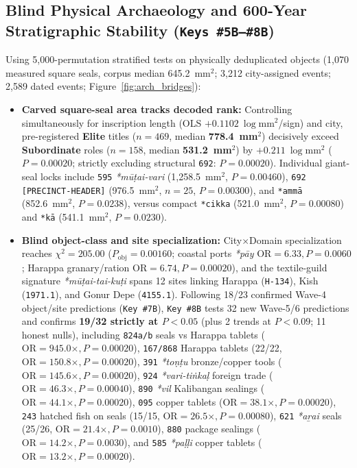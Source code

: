 \documentclass[11pt,a4paper]{article}
\begin{document}
\subsection{Blind Physical Archaeology and 600-Year Stratigraphic Stability (\texttt{Keys \#5B--\#8B})}

Using 5,000-permutation stratified tests on physically deduplicated objects (1,070 measured square seals, corpus median 645.2~mm$^2$; 3,212 city-assigned events; 2,589 dated events; Figure~\ref{fig:arch_bridges}):
\begin{itemize}
  \item \textbf{Carved square-seal area tracks decoded rank:} Controlling simultaneously for inscription length (OLS $+0.1102\ \log\text{mm}^2$/sign) and city, pre-registered \textbf{Elite} titles ($n = 469$, median \textbf{778.4~mm$^2$}) decisively exceed \textbf{Subordinate} roles ($n = 158$, median \textbf{531.2~mm$^2$}) by $+0.211\ \log\text{mm}^2$ ($P = 0.00020$; strictly excluding structural \texttt{692}: $P = 0.00020$). Individual giant-seal locks include \texttt{595} \textit{*mūṭai-vari} (1,258.5~mm$^2$, $P = 0.00460$), \texttt{692} \texttt{[PRECINCT-HEADER]} (976.5~mm$^2$, $n=25$, $P = 0.00300$), and \texttt{*ammā} (852.6~mm$^2$, $P = 0.0238$), versus compact \texttt{*cikka} (521.0~mm$^2$, $P = 0.00080$) and \texttt{*kā} (541.1~mm$^2$, $P = 0.0230$).
  \item \textbf{Blind object-class and site specialization:} City$\times$Domain specialization reaches $\chi^2 = 205.00$ ($P_{\text{obj}} = 0.00160$; coastal ports \textit{*pāy} $\text{OR} = 6.33, P = 0.0060$; Harappa granary/ration $\text{OR} = 6.74, P = 0.00020$), and the textile-guild signature \textit{*mūṭai-tai-kuṭi} spans 12 sites linking Harappa (\texttt{H-134}), Kish (\texttt{1971.1}), and Gonur Depe (\texttt{4155.1}). Following 18/23 confirmed Wave-4 object/site predictions (\texttt{Key \#7B}), \texttt{Key \#8B} tests 32 new Wave-5/6 predictions and confirms \textbf{19/32 strictly at $P < 0.05$} (plus 2 trends at $P < 0.09$; 11 honest nulls), including \texttt{824a/b} seals vs Harappa tablets ($\text{OR} = 945.0\times, P = 0.00020$), \texttt{167/868} Harappa tablets (22/22, $\text{OR} = 150.8\times, P = 0.00020$), \texttt{391} \textit{*toṇṭu} bronze/copper tools ($\text{OR} = 145.6\times, P = 0.00020$), \texttt{924} \textit{*vari-tiṅkaḷ} foreign trade ($\text{OR} = 46.3\times, P = 0.00040$), \texttt{890} \textit{*vil} Kalibangan sealings ($\text{OR} = 44.1\times, P = 0.00020$), \texttt{095} copper tablets ($\text{OR} = 38.1\times, P = 0.00020$), \texttt{243} hatched fish on seals (15/15, $\text{OR} = 26.5\times, P = 0.00080$), \texttt{621} \textit{*aṟai} seals (25/26, $\text{OR} = 21.4\times, P = 0.0010$), \texttt{880} package sealings ($\text{OR} = 14.2\times, P = 0.0030$), and \texttt{585} \textit{*paḷḷi} copper tablets ($\text{OR} = 13.2\times, P = 0.00020$).

\end{itemize}
\end{document}
